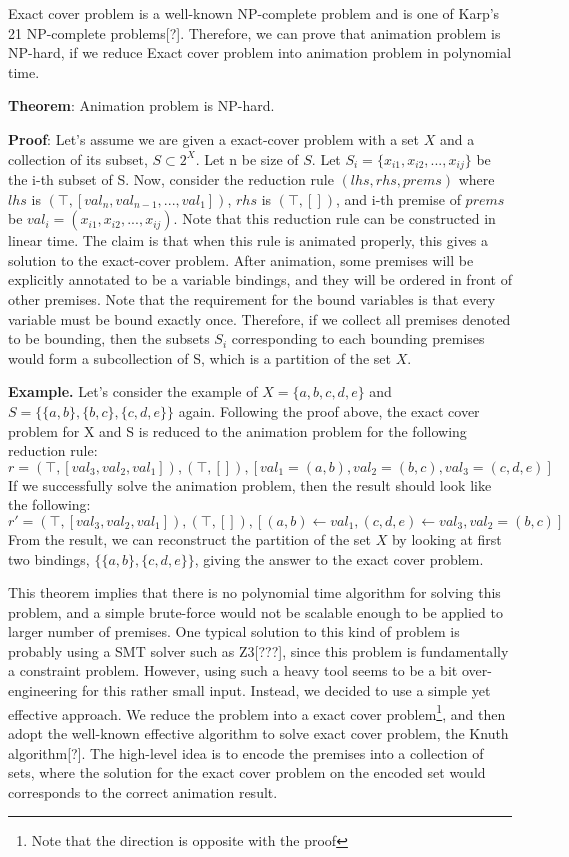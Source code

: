 Exact cover problem is a well-known NP-complete problem and is one of Karp's 21 NP-complete problems[?].
Therefore, we can prove that animation problem is NP-hard, if we reduce Exact cover problem
into animation problem in polynomial time.

\textbf{Theorem}: Animation problem is NP-hard.

\textbf{Proof}: Let's assume we are given a exact-cover problem with a set $X$ and a
collection of its subset, $S \subset 2^X$. Let n be size of $S$.
Let $S_i = \{x_{i1}, x_{i2}, ..., x_{ij}\}$ be the i-th subset of S.
Now, consider the reduction rule $(lhs, rhs, prems)$ where
$lhs$ is $(\top, [val_n, val_{n-1}, ..., val_1])$,
$rhs$ is $(\top, [])$, and
i-th premise of $prems$ be $val_i = (x_{i1}, x_{i2}, ..., x_{ij})$.
Note that this reduction rule can be constructed in linear time.
The claim is that when this rule is animated properly, this gives a solution to the exact-cover problem.
After animation, some premises will be explicitly annotated to be a variable bindings,
and they will be ordered in front of other premises. Note that the requirement for the
bound variables is that every variable must be bound exactly once. Therefore, if we collect
all premises denoted to be bounding, then the subsets $S_i$ corresponding to each bounding premises
would form a subcollection of S, which is a partition of the set $X$.

\textbf{Example.}
Let's consider the example of $X = \{a, b, c, d, e\}$ and $S = \{\{a,b\}, \{b,c\}, \{c,d,e\}\}$ again.
Following the proof above, the exact cover problem for X and S is reduced to the animation problem for the
following reduction rule:
\[r = (\top, [val_3, val_2, val_1]), (\top, []), [val_1 = (a,b), val_2 = (b,c), val_3 = (c, d, e)]\]
If we successfully solve the animation problem, then the result should look like the following:
\[r' = (\top, [val_3, val_2, val_1]), (\top, []), [(a,b) \leftarrow val_1, (c, d, e) \leftarrow val_3, val_2 = (b,c)]\]
From the result, we can reconstruct the partition of the set $X$ by looking at first two bindings,
$\{\{a, b\}, \{c, d, e\}\}$, giving the answer to the exact cover problem.

This theorem implies that there is no polynomial time algorithm for solving this problem, and a
simple brute-force would not be scalable enough to be applied to larger number of premises.
One typical solution to this kind of problem is probably using a SMT solver such as Z3[???], since
this problem is fundamentally a constraint problem.
However, using such a heavy tool seems to be a bit over-engineering for this rather small input.
Instead, we decided to use a simple yet effective approach.
We reduce the problem into a exact cover problem\footnote{Note that the direction is opposite with
the proof}, and then adopt the well-known effective algorithm to solve exact cover problem,
the Knuth algorithm[?]. The high-level idea is to encode the premises into a
collection of sets, where the solution for the exact cover problem on the encoded set
would corresponds to the correct animation result.

